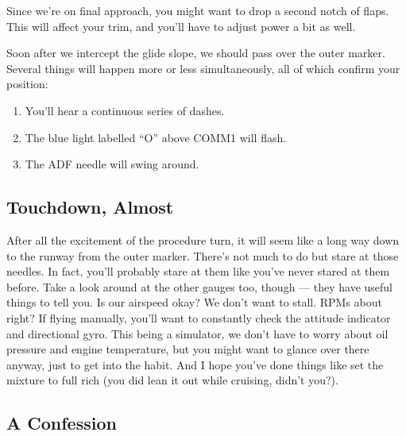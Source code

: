 Since we're on final approach, you might want to drop a second notch
of flaps.  This will affect your trim, and you'll have to adjust power
a bit as well.

Soon after we intercept the glide slope, we should pass over the outer
marker.  Several things will happen more or less simultaneously, all
of which confirm your position:





\begin{enumerate}
\item You'll hear a continuous series of dashes.
\item The blue light labelled ``O'' above COMM1 will flash.
\item The ADF needle will swing around.
\end{enumerate}

\subsection{Touchdown, Almost}

After all the excitement of the procedure turn, it will seem like a
long way down to the runway from the outer marker.  There's not much
to do but stare at those needles.  In fact, you'll probably stare at
them like you've never stared at them before.  Take a look around at
the other gauges too, though --- they have useful things to tell you.
Is our airspeed okay?  We don't want to stall.  RPMs about right?  If
flying manually, you'll want to constantly check the attitude
indicator and directional gyro.  This being a simulator, we don't have
to worry about oil pressure and engine temperature, but you might want
to glance over there anyway, just to get into the habit.  And I hope
you've done things like set the mixture to full rich (you did lean it
out while cruising, didn't you?).

\subsection{A Confession}

